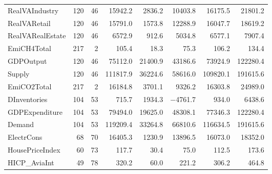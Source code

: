 {\begin{tabular}[t]{lrrrrrrr}
RealVAIndustry & 120 & 46 & \num{15942.2} & \num{2836.2} & \num{10403.8} & \num{16175.5} & \num{21801.2}\\
RealVARetail & 120 & 46 & \num{15791.0} & \num{1573.8} & \num{12288.9} & \num{16047.7} & \num{18619.2}\\
RealVARealEstate & 120 & 46 & \num{6572.9} & \num{912.6} & \num{5034.8} & \num{6577.1} & \num{7907.4}\\
EmiCH4Total & 217 & 2 & \num{105.4} & \num{18.3} & \num{75.3} & \num{106.2} & \num{134.4}\\
GDPOutput & 120 & 46 & \num{75112.0} & \num{21400.9} & \num{43186.6} & \num{73924.9} & \num{122280.4}\\
Supply & 120 & 46 & \num{111817.9} & \num{36224.6} & \num{58616.0} & \num{109820.1} & \num{191615.6}\\
EmiCO2Total & 217 & 2 & \num{16184.8} & \num{3701.1} & \num{9326.2} & \num{16303.8} & \num{24989.0}\\
DInventories & 104 & 53 & \num{715.7} & \num{1934.3} & \num{-4761.7} & \num{934.0} & \num{6438.6}\\
GDPExpenditure & 104 & 53 & \num{79494.0} & \num{19625.0} & \num{48308.1} & \num{77346.3} & \num{122280.4}\\
Demand & 104 & 53 & \num{119209.4} & \num{33264.8} & \num{66810.6} & \num{116634.5} & \num{191615.6}\\
ElectrCons & 68 & 70 & \num{16405.3} & \num{1230.9} & \num{13896.5} & \num{16073.0} & \num{18352.0}\\
HousePriceIndex & 60 & 73 & \num{117.7} & \num{30.4} & \num{75.0} & \num{112.5} & \num{173.6}\\
HICP\_AviaInt & 49 & 78 & \num{320.2} & \num{60.0} & \num{221.2} & \num{306.2} & \num{464.8}\\
\bottomrule
\end{tabular}}
